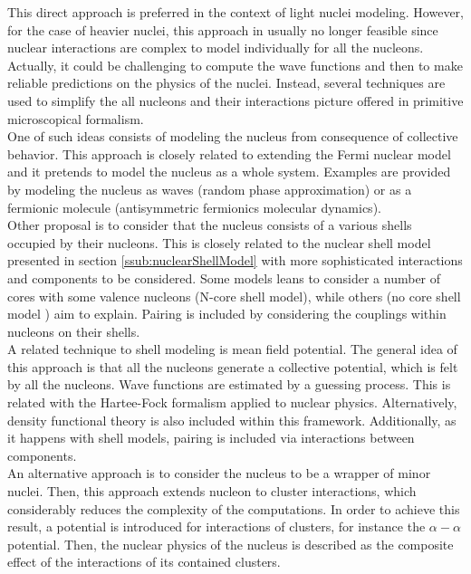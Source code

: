 \documentclass[openany]{book}
\begin{document}
This direct approach is preferred in the context of light nuclei modeling. However, for the case of heavier nuclei, this approach in usually no longer feasible since nuclear interactions are complex to model individually for all the nucleons. Actually, it could be challenging to compute the wave functions and then to make reliable predictions on the physics of the nuclei. Instead, several techniques are used to simplify the all nucleons and their interactions picture offered in primitive microscopical formalism. \\

One of such ideas consists of modeling  the nucleus from  consequence of collective behavior. This approach is closely related to extending the Fermi nuclear model and it pretends to model the nucleus as a whole system. Examples are provided by modeling the nucleus as waves (random phase approximation) or as a fermionic molecule (antisymmetric fermionics molecular dynamics).  \\

Other proposal is to consider that the nucleus consists of a various shells occupied by their nucleons. This is closely related to the nuclear shell model presented in section \ref{ssub:nuclearShellModel} with more sophisticated interactions and components to be considered. Some models leans to consider a number of cores with some valence nucleons (N-core shell model), while others (no core  shell model ) aim to explain. Pairing is included by considering the couplings within nucleons on their shells.  \\

A related technique to shell modeling is mean field potential. The general idea of this approach is that all the nucleons generate a collective potential, which is felt by all the nucleons. Wave functions are estimated by a guessing process. This is related with the Hartee-Fock formalism applied to nuclear physics. Alternatively, density functional theory is also included within this framework. Additionally, as it happens with shell models, pairing is included via interactions between components. \\

An alternative approach is to consider the nucleus to be a wrapper of minor nuclei. Then, this approach extends nucleon to cluster interactions, which considerably reduces the complexity of the computations. In order to achieve this result, a potential is introduced for interactions of clusters, for instance the $\alpha-\alpha$ potential. Then, the nuclear physics of the nucleus is described as the composite effect of the interactions of its contained clusters. \\
\end{document}
